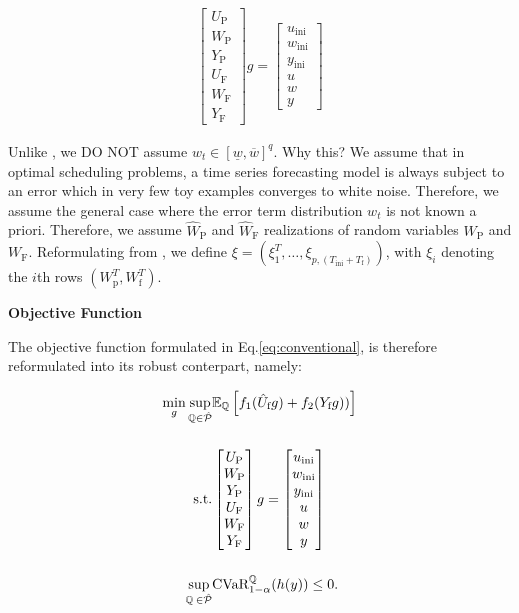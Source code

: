 \documentclass[12pt, a4paper]{article}
\begin{document}
\begin{align}
        \begin{bmatrix}
        U_\text{P} \\
        W_\text{P} \\
        Y_\text{P} \\
        U_\text{F} \\
        W_\text{F} \\
        Y_\text{F}
        \end{bmatrix} g =
        \begin{bmatrix}
        u_\text{ini} \\
        w_\text{ini} \\
        y_\text{ini} \\
        u \\
        w \\
        y
        \end{bmatrix}
\end{align}

\noindent Unlike \cite{huang2021decentralized}, we DO NOT assume $w_{t} \in [\underline{w}
, \overline{w}]^q$. Why this? We assume that in optimal scheduling problems, a time series forecasting model is always subject to an error which in very few toy examples converges to white noise. Therefore, we assume the general case where the error term distribution $w_t$ is not known a priori. 
Therefore, we assume $\hat{W}_\text{P}$ and $\hat{W}_\text{F}$ realizations of random variables $W_\text{P}$ and $W_\text{F}$. Reformulating from \cite{coulson2021distributionally}, we define $\xi = (\xi_{1}^T, \dots, \xi_{p, (T_{\text{ini}}+T_{\text{f}})})$, with $\xi_i$ denoting the $i$th rows $(W_{\text{p}}^T, W_{\text{f}}^T)$. 

\textbf{Objective Function}

The objective function formulated in Eq.\ref{eq:conventional}, is therefore reformulated into its robust conterpart, namely: 

\begin{align}
   \min_{g} \sup_{\mathbb{Q} \in \hat{\mathcal{P}}}& \mathbb{E}_\mathbb{Q} \left[f_1(\hat{U}_\text{f}g) + f_2(Y_\text{f}g))\right] \notag \\[0.5cm]
   \text{s.t.} &\begin{bmatrix}
    U_\text{P} \\
    W_\text{P} \\
    Y_\text{P} \\
    U_\text{F} \\
    W_\text{F} \\
    Y_\text{F}
    \end{bmatrix} g =
    \begin{bmatrix}
    u_\text{ini} \\
    w_\text{ini} \\
    y_\text{ini} \\
    u \\
    w \\
    y
    \end{bmatrix} \notag \\[0.5cm]
   \sup_{\mathbb{Q} \: \in \hat{\mathcal{P}}}& \text{CVaR}_{1-\alpha}^{\mathbb{Q}}(h(y)) \leq 0.
\end{align}
\end{document}
